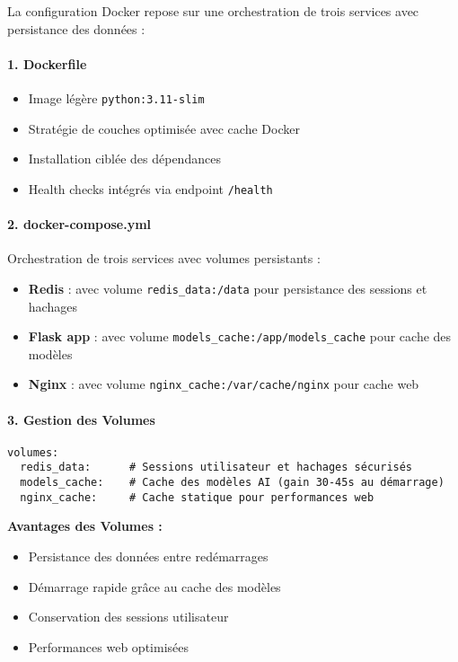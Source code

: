 \documentclass[12pt,a4paper]{article}
\begin{document}
\begin{implementedbox}
La configuration Docker repose sur une orchestration de trois services avec persistance des données :

\paragraph{1. Dockerfile}
\begin{itemize}
  \item Image légère \texttt{python:3.11-slim}
  \item Stratégie de couches optimisée avec cache Docker
  \item Installation ciblée des dépendances
  \item Health checks intégrés via endpoint \texttt{/health}
\end{itemize}

\paragraph{2. docker-compose.yml}
Orchestration de trois services avec volumes persistants :
\begin{itemize}
  \item \textbf{Redis} : avec volume \texttt{redis\_data:/data} pour persistance des sessions et hachages
  \item \textbf{Flask app} : avec volume \texttt{models\_cache:/app/models\_cache} pour cache des modèles
  \item \textbf{Nginx} : avec volume \texttt{nginx\_cache:/var/cache/nginx} pour cache web
\end{itemize}

\paragraph{3. Gestion des Volumes}
\begin{verbatim}
volumes:
  redis_data:      # Sessions utilisateur et hachages sécurisés
  models_cache:    # Cache des modèles AI (gain 30-45s au démarrage)
  nginx_cache:     # Cache statique pour performances web
\end{verbatim}

\textbf{Avantages des Volumes :}
\begin{itemize}
  \item Persistance des données entre redémarrages
  \item Démarrage rapide grâce au cache des modèles
  \item Conservation des sessions utilisateur
  \item Performances web optimisées
\end{itemize}
\end{implementedbox}
\end{document}
